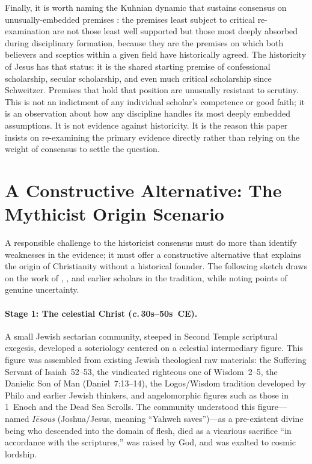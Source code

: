 \documentclass[12pt,oneside]{article}
\newcommand{\circa}{\textit{c.}\,}
\newcommand{\grk}[1]{\textit{#1}}   %
\begin{document}
Finally, it is worth naming the Kuhnian dynamic that sustains
consensus on unusually-embedded premises \citep{Kuhn1962}: the
premises least subject to critical re-examination are not those least
well supported but those most deeply absorbed during disciplinary
formation, because they are the premises on which both believers and
sceptics within a given field have historically agreed.  The
historicity of Jesus has that status: it is the shared starting
premise of confessional scholarship, secular scholarship, and even
much critical scholarship since Schweitzer.  Premises that hold that
position are unusually resistant to scrutiny.  This is not an
indictment of any individual scholar's competence or good faith; it
is an observation about how any discipline handles its most deeply
embedded assumptions.  It is not evidence against historicity.  It
is the reason this paper insists on re-examining the primary
evidence directly rather than relying on the weight of consensus to
settle the question.


\section{A Constructive Alternative: The Mythicist Origin Scenario}
\label{sec:origins}

A responsible challenge to the historicist consensus must do more than
identify weaknesses in the evidence; it must offer a constructive
alternative that explains the origin of Christianity without a
historical founder.  The following sketch draws on the work of
\citet{Doherty1999,Doherty2009}, \citet{Carrier2014}, and earlier
scholars in the tradition, while noting points of genuine uncertainty.

\paragraph{Stage 1: The celestial Christ (\circa 30s--50s~CE).}
A small Jewish sectarian community, steeped in Second Temple scriptural
exegesis, developed a soteriology centered on a celestial intermediary
figure.  This figure was assembled from existing Jewish theological raw
materials: the Suffering Servant of Isaiah~52--53, the vindicated
righteous one of Wisdom~2--5, the Danielic Son of Man (Daniel~7:13--14),
the Logos/Wisdom tradition developed by Philo and earlier Jewish
thinkers, and angelomorphic figures such as those in 1~Enoch and the
Dead Sea Scrolls.  The community understood this figure---named
\grk{I\=esous} (Joshua/Jesus, meaning ``Yahweh saves'')---as a
pre-existent divine being who descended into the domain of flesh, died
as a vicarious sacrifice ``in accordance with the scriptures,'' was
raised by God, and was exalted to cosmic lordship.
\end{document}
